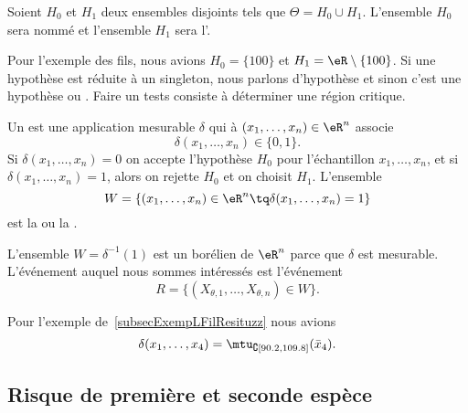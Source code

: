 Soient \( H_0\) et \( H_1\) deux ensembles disjoints tels que \( \Theta=H_0\cup H_1\). L'ensemble \( H_0\) sera nommé  et l'ensemble \( H_1\) sera l'.

Pour l'exemple des fils, nous avions \( H_0=\{ 100 \}\) et \( H_1=\eR\setminus\{ 100 \}\). Si une hypothèse est réduite à un singleton, nous parlons d'hypothèse  et sinon c'est une hypothèse  ou . Faire un tests consiste à déterminer une région critique.

\begin{definition}
	Un  est une application mesurable \( \delta\) qui à \( (x_1,\ldots,x_n)\in\eR^n\) associe
	\begin{equation}
		\delta(x_1,\ldots,x_n)\in\{ 0,1 \}.
	\end{equation}
	Si \( \delta(x_1,\ldots,x_n)=0\) on accepte l'hypothèse \( H_0\) pour l'échantillon \( x_1,\ldots,x_n\), et si \( \delta(x_1,\ldots,x_n)=1\), alors on rejette \( H_0\) et on choisit \( H_1\). L'ensemble
	\begin{equation}
		W=\{ (x_1,\ldots,x_n)\in\eR^n\tq \delta(x_1,\ldots,x_n)=1 \}
	\end{equation}
	est la  ou la .
\end{definition}

L'ensemble \( W=\delta^{-1}(1)\) est un borélien de \( \eR^n\) parce que \( \delta\) est mesurable. L'événement auquel nous sommes intéressés est l'événement
\begin{equation}
	R=\{ (X_{\theta,1},\ldots,X_{\theta,n})\in W \}.
\end{equation}


\begin{example}
	Pour l'exemple de~\ref{subsecExempLFilResituzz} nous avions
	\begin{equation}
		\delta(x_1,\ldots,x_4)=\mtu_{\complement\mathopen[ 90.2 , 109.8 \mathclose]}(\bar x_4).
	\end{equation}
\end{example}

\subsection{Risque de première et seconde espèce}

